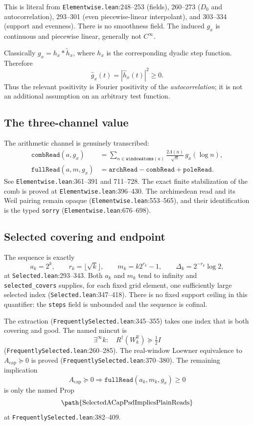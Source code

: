 \documentclass[11pt]{article}
\newcommand{\Rd}{R^{\dagger}}
\begin{document}
\noindent
This is literal from
\texttt{Elementwise.lean}:248--253 (fields),
260--273 ($D_0$ and autocorrelation),
293--301 (even piecewise-linear interpolant), and
303--334 (support and evenness).
There is no smoothness field.  The induced $g_x$ is continuous
and piecewise linear, generally not $C^\infty$.

Classically $g_x=h_x*\widetilde h_x$, where $h_x$ is the
corresponding dyadic step function.  Therefore
\[
 \widehat g_x(t)=|\widehat h_x(t)|^2\ge0.
\]
Thus the relevant positivity is Fourier positivity of the
\emph{autocorrelation}; it is not an additional assumption on
an arbitrary test function.

\subsection{The three-channel value}

The arithmetic channel is genuinely transcribed:
\[
\begin{split}
\texttt{combRead}(a,g_x)
  &=\sum_{n\in\texttt{windowAtoms}(a)}
       \frac{2\Lambda(n)}{\sqrt n}\,g_x(\log n),\\
\texttt{fullRead}(a,m,g_x)
  &=\texttt{archRead}-\texttt{combRead}+\texttt{poleRead}.
\end{split}
\]
See \texttt{Elementwise.lean}:361--391 and 711--728.
The exact finite stabilization of the comb is proved at
\texttt{Elementwise.lean}:396--430.
The archimedean read and its Weil pairing remain opaque
(\texttt{Elementwise.lean}:553--565), and their identification is
the typed \texttt{sorry}
(\texttt{Elementwise.lean}:676--698).

\subsection{Selected covering and endpoint}

The sequence is exactly
\[
 a_k=2^k,\qquad r_k=\lfloor\sqrt k\rfloor,\qquad
 m_k=k2^{r_k}-1,\qquad
 \Delta_k=2^{-r_k}\log2,
\]
at \texttt{Selected.lean}:293--343.
Both $a_k$ and $m_k$ tend to infinity and
\texttt{selected\_covers} supplies, for each fixed grid element,
one sufficiently large selected index
(\texttt{Selected.lean}:347--418).
There is no fixed support ceiling in this quantifier: the
\texttt{steps} field is unbounded and the sequence is cofinal.

The extraction
(\texttt{FrequentlySelected.lean}:345--355) takes one index that
is both covering and good.  The named mincut is
\[
 \exists^\infty k:\quad
 \Rd(W_k^{\mathbb R})\succeq\tfrac12 I
\]
(\texttt{FrequentlySelected.lean}:260--285).
The real-window Loewner equivalence to
$A_{\mathrm{cap}}\succeq0$ is proved
(\texttt{FrequentlySelected.lean}:370--380).
The remaining implication
\[
 A_{\mathrm{cap}}\succeq0
 \Longrightarrow
 \texttt{fullRead}(a_k,m_k,g_x)\ge0
\]
is only the named Prop
\[
 \text{\path{SelectedACapPsdImpliesPlainReads}}
\]
at \texttt{FrequentlySelected.lean}:382--409.
\end{document}
